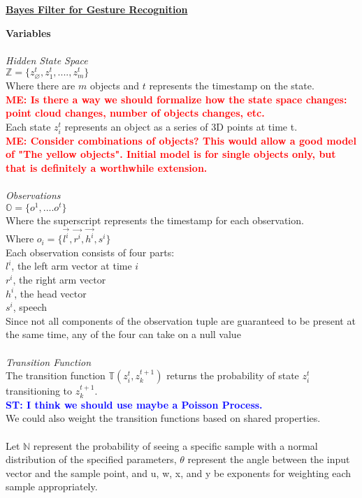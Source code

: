 \documentclass[12pt,letterpaper]{article}
\newcommand{\stnote}[1]{\textcolor{Blue}{\textbf{ST: #1}}}
\newcommand{\menote}[1]{\textcolor{Red}{\textbf{ME: #1}}}
\begin{document}
\begin{center}\textbf{\underline{Bayes Filter for Gesture Recognition}}\end{center}
\textbf{Variables}\\\\
\textit{Hidden State Space}\\
$\mathbb{Z} = \{z^t_\varnothing, z^t_1, ...., z^t_m\}$\\
Where there are $m$ objects and $t$ represents the timestamp on the state.\\
\menote{Is there a way we should formalize how the state space changes: point cloud changes, number of objects changes, etc.}\\
Each state $z^t_i$ represents an object as a series of 3D points at time t.\\
\menote{Consider combinations of objects? This would allow a good model of "The yellow objects". Initial model is for single objects only, but that is definitely a worthwhile extension.}\\\\
\textit{Observations}\\
$\mathbb{O} = \{o^1, .... o^t\}$\\
Where the superscript represents the timestamp for each observation.\\
Where $o_i= \{\vec{l^i},\vec{r^i}, \vec{h^i}, s^i\}$\\
Each observation consists of four parts:\\
$l^i$, the left arm vector at time $i$\\
$r^i$, the right arm vector\\
$h^i$, the head vector\\
$s^i$, speech\\
Since not all components of the observation tuple are guaranteed to be present at the same time, any of the four can take on a null value\\\\
\textit{Transition Function}\\
The transition function $\mathbb{T}(z^t_i, z^{t+1}_k)$ returns the probability of state $z^t_i$ transitioning to $z^{t+1}_k$.\\
\stnote{I think we should use maybe a Poisson Process. }\\
We could also weight the transition functions based on shared properties.\\\\
Let $\mathbb{N}$ represent the probability of seeing a specific sample with a  normal distribution of the specified parameters,  $\theta$ represent the angle between the input vector and the sample point, and u, w, x, and y be exponents for weighting each sample appropriately.\\\\
\end{document}

